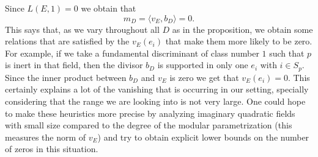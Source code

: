 \documentclass[13pt]{amsart}
\theoremstyle{remark}
\numberwithin{theorem}{section} \numberwithin{equation}{section}
\begin{document}
Since  $L(E,1)=0$ we obtain that 
\[m_D=\langle v_E, b_D 
\rangle=0.\] This says that, as we vary throughout all $D$ as in the 
proposition, we obtain some relations that are satisfied by the $v_{E}(e_{i})$ 
that make them more likely to be zero. For example, if we take a fundamental 
discriminant of class number $1$ such that $p$ is inert in that field, then the 
divisor $b_{D}$ is supported in only one $e_{i}$ with $i \in S_{p}$. Since the 
inner product between $b_{D}$ and $v_{E}$ is zero we get that $v_{E}(e_{i})=0$. 
This certainly explains a lot of the vanishing that is occurring in our 
setting, specially considering that the range we are looking into is not very 
large. One could hope to make these heuristics more precise by analyzing  
imaginary quadratic fields with small size compared to the degree of the 
modular parametrization (this measures the norm of $v_E$) and try to 
obtain explicit lower bounds on the number of zeros in this situation.
\end{document}
